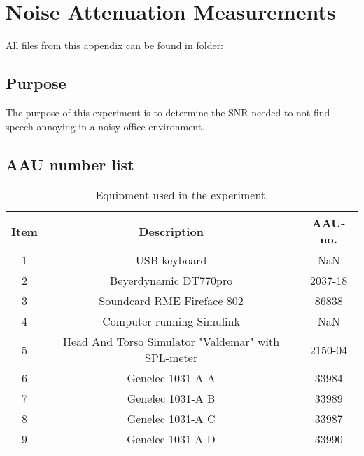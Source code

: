 \section{Noise Attenuation Measurements}

All files from this appendix can be found in folder: \\

\subsection{Purpose}

The purpose of this experiment is to determine the SNR needed to not find speech annoying in a noisy office environment. 

\subsection{AAU number list}

\begin{table}[h]
	\centering
	
	\begin{tabular}{ c c c } \toprule
		{Item} & {Description} & {AAU-no}. \\ \bottomrule 
		1      	&  USB keyboard							& NaN		\\
		2      	&  Beyerdynamic DT770pro				& 2037-18	\\
		3      	&  Soundcard RME Fireface 802           & 86838		\\
		4      	&  Computer	running Simulink			& NaN		\\  
		5		&  Head And Torso Simulator "Valdemar" with SPL-meter					& 2150-04	\\
		6      	&  Genelec 1031-A A					& 33984		\\
		7      	&  Genelec 1031-A B					& 33989		\\
		8      	&  Genelec 1031-A C					& 33987		\\
		9      	&  Genelec 1031-A D					& 33990		\\ \bottomrule 
	\end{tabular}
	\caption{Equipment used in the experiment.}
	\label{tab:UsedEquipmentListningAttenuation}
\end{table}



